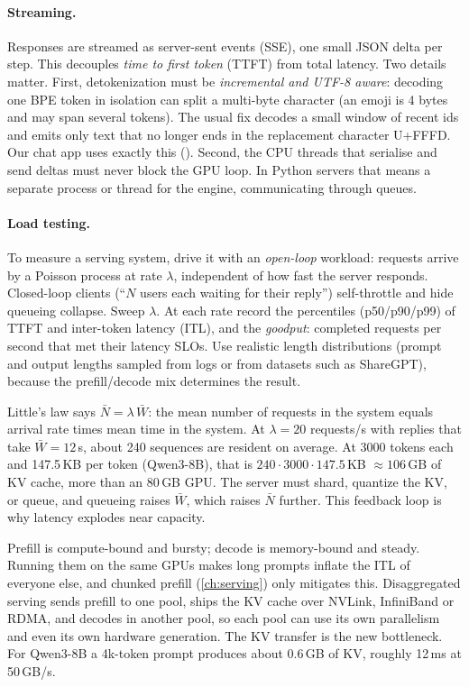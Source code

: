 \paragraph{Streaming.} Responses are streamed as server-sent events (SSE), one small JSON
delta per step. This decouples \emph{time to first token} (TTFT) from total latency.
Two details matter. First, detokenization must be \emph{incremental and UTF-8 aware}:
decoding one BPE token in isolation can split a multi-byte character (an emoji is 4
bytes and may span several tokens). The usual fix decodes a small window of recent ids
and emits only text that no longer ends in the replacement character U+FFFD. Our chat app
uses exactly this (). Second, the CPU threads that
serialise and send deltas must never block the GPU loop. In Python servers that means a
separate process or thread for the engine, communicating through queues.

\paragraph{Load testing.} To measure a serving system, drive it with an \emph{open-loop}
workload: requests arrive by a Poisson process at rate $\lambda$, independent of how fast
the server responds. Closed-loop clients (``$N$ users each waiting for their reply'')
self-throttle and hide queueing collapse. Sweep $\lambda$. At each rate record the
percentiles (p50/p90/p99) of TTFT and inter-token latency (ITL), and the \emph{goodput}:
completed requests per second that met their latency SLOs. Use realistic length
distributions (prompt and output lengths sampled from logs or from datasets such as
ShareGPT), because the prefill/decode mix determines the result.

\begin{napkinmath}
Little's law says $\bar N = \lambda\,\bar W$: the mean number of requests in the system
equals arrival rate times mean time in the system. At $\lambda=20$ requests/s with
replies that take $\bar W=12$\,s, about 240 sequences are resident on average. At 3000
tokens each and 147.5\,KB per token (Qwen3-8B), that is $240\cdot 3000\cdot 147.5$\,KB
$\approx 106$\,GB of KV cache, more than an 80\,GB GPU. The server must shard, quantize
the KV, or queue, and queueing raises $\bar W$, which raises $\bar N$ further. This
feedback loop is why latency explodes near capacity.
\end{napkinmath}

\begin{systemslens}
Prefill is compute-bound and bursty; decode is memory-bound and steady. Running them on
the same GPUs makes long prompts inflate the ITL of everyone else, and chunked prefill
(\cref{ch:serving}) only mitigates this. Disaggregated serving sends prefill to one pool,
ships the KV cache over NVLink, InfiniBand or RDMA, and decodes in another pool, so each
pool can use its own parallelism and even its own hardware generation. The KV transfer
is the new bottleneck. For Qwen3-8B a 4k-token prompt produces about 0.6\,GB of KV,
roughly 12\,ms at 50\,GB/s.
\end{systemslens}

